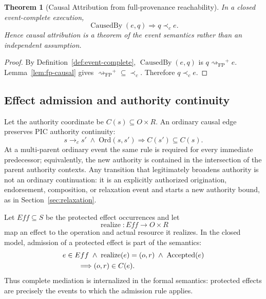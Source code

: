 \documentclass[10pt,twocolumn]{article}
\newcommand{\FP}{\mathrm{FP}}
\newcommand{\Influence}{\mathrel{\rightsquigarrow_{\!\FP}}}
\newcommand{\CausedBy}{\operatorname{CausedBy}}
\newcommand{\Realize}{\operatorname{realize}}
\newcommand{\Accepted}{\operatorname{Accepted}}
\newcommand{\hb}{\prec_{c}}
\newtheorem{theorem}{Theorem}
\begin{document}
\begin{theorem}[Causal Attribution from full-provenance reachability]
\label{thm:derived-ca}
In a closed event-complete execution,
\begin{equation}
  \CausedBy(e,q)\Longrightarrow q\hb e.
  \label{eq:ca-derived}
\end{equation}
Hence causal attribution is a theorem of the event semantics rather than an
independent assumption.
\end{theorem}

\begin{proof}
By Definition~\ref{def:event-complete}, $\CausedBy(e,q)$ is
$q\Influence^{+}e$. Lemma~\ref{lem:fp-causal} gives
$\Influence^{+}\subseteq\hb$. Therefore $q\hb e$.
\end{proof}

\subsection{Effect admission and authority continuity}

Let the authority coordinate be $C(s)\subseteq O\times R$. An ordinary causal
edge preserves PIC authority continuity:
\begin{equation}
  s\to_c s'\;\land\;\mathrm{Ord}(s,s')
  \Longrightarrow C(s')\subseteq C(s).
  \label{eq:authority-edge}
\end{equation}
At a multi-parent ordinary event the same rule is required for every immediate
predecessor; equivalently, the new authority is contained in the intersection
of the parent authority contexts. Any transition that legitimately broadens
authority is not an ordinary continuation: it is an explicitly authorized
origination, endorsement, composition, or relaxation event and starts a new
authority bound, as in Section~\ref{sec:relaxation}.

Let $Eff\subseteq S$ be the protected effect occurrences and let
\begin{equation}
  \Realize:Eff\to O\times R
\end{equation}
map an effect to the operation and actual resource it realizes. In the closed
model, admission of a protected effect is part of the semantics:
\begin{equation}
\begin{aligned}
  &e\in Eff\;\land\;\Realize(e)=(o,r)\;\land\;\Accepted(e)\\
  &\hspace{2.2em}\Longrightarrow (o,r)\in C(e).
\end{aligned}
\label{eq:effect-admission}
\end{equation}
Thus complete mediation is internalized in the formal semantics: protected
effects are precisely the events to which the admission rule applies.
\end{document}
